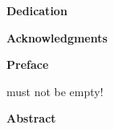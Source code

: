 
\ifx\Dedication\empty
\else
    \begingroup

    \centering
    \textbf{Dedication}

    \flushleft
    \Dedication

    \endgroup
    \clearpage
\fi


\ifx\Acknowledgements\empty
\else
    \begingroup

    \centering
    \textbf{Acknowledgments}

    \flushleft
    \Acknowledgements

    \endgroup
    \clearpage
\fi


\ifx\Preface\empty
\else
    \begingroup

    \centering
    \textbf{Preface}

    \flushleft
    \Preface

    \endgroup
    \clearpage
\fi


\ifx\Abstract\empty
    \errmessage \Abstract must not be empty!
\else
    \begingroup

    \centering
    \textbf{Abstract}

    \flushleft
    \Abstract

    \endgroup
    \clearpage
\fi


\tableofcontents

\ifHasListOfTables
    \listoftables
\fi

\ifHasListOfFigures
    \listoffigures
\fi

\clearpage
